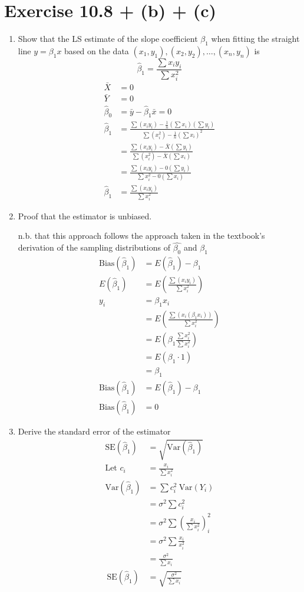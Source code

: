 \documentclass{article}
\newcommand{\var}{\text{Var}}
\begin{document}
\section*{Exercise 10.8 + (b) + (c)}

\begin{enumerate}[\quad(a)]
	\item Show that the LS estimate of the slope coefficient $\beta_1$ when fitting the straight line $y=\beta_1x$ based on the data $(x_1, y_1), (x_2, y_2), \ldots, (x_n, y_n)$ is \[ \hat{\beta}_1 = \frac{\sum x_i y_i}{\sum x_i^2} \]
	\begin{align*}
		\bar{X} &= 0\\
		\bar{Y} &= 0\\
		\hat{\beta}_0 &= \bar{y} - \hat{\beta}_1\bar{x} = 0 \\
		\hat{\beta}_1 &= \frac{\sum(x_i y_i) - \tfrac{1}{n}(\sum x_i) (\sum y_i)}{\sum(x_i^2) - \tfrac{1}{n}(\sum x_i)^2} \\
		&= \frac{\sum(x_i y_i) - \bar{X} (\sum y_i)}{\sum(x_i^2) - \bar{X}(\sum x_i)}\\
		&= \frac{\sum(x_i y_i) - 0 (\sum y_i)}{\sum x_i^2 - 0(\sum x_i)}\\
		\hat{\beta}_1 &= \frac{\sum(x_i y_i)}{\sum x_i^2}
	\end{align*}
	\item Proof that the estimator is unbiased.

	n.b. that this approach follows the approach taken in the textbook's derivation of the sampling distributions of $\hat{\beta_0}$ and $\hat{\beta_1}$
	\begin{align*}
		\text{Bias}(\hat{\beta}_1) &= E(\hat{\beta}_1) - \beta_1 \\
		E(\hat{\beta}_1) &= E\left( \frac{\sum(x_i y_i)}{\sum x_i^2} \right) \\
		y_i &= \beta_1 x_i \\
		&= E \left( \frac{\sum(x_i (\beta_1 x_i))}{\sum x_i^2}  \right) \\
		&= E(\beta_1 \frac{\sum x_i^2}{\sum x_i^2}) \\
		&= E(\beta_1 \cdot 1) \\
		&= \beta_1 \\
		\text{Bias}(\hat{\beta}_1) &= E(\hat{\beta}_1) - \beta_1 \\
		\text{Bias}(\hat{\beta}_1) &= 0
	\end{align*}
	\item Derive the standard error of the estimator
	\begin{align*}
		\text{SE}(\hat{\beta}_1) &= \sqrt{\var(\hat{\beta}_1)}\\
		\text{Let } c_i &= \frac{x_i}{\sum x_i^2}\\
		\var(\hat{\beta}_1) &= \sum c^2_i\ \var(Y_i)\\
		&= \sigma^2 \sum c^2_i\\
		&= \sigma^2 \sum \left( \frac{x_i}{\sum x_i^2} \right) ^2_i\\
		&= \sigma^2 \sum \frac{x_i}{x_i^2}\\
		&= \frac{\sigma^2}{\sum x_i} \\\
		\text{SE}(\hat{\beta}_1) &= \sqrt{\frac{\sigma^2}{\sum x_i}}
	\end{align*}
\end{enumerate}
\end{document}
